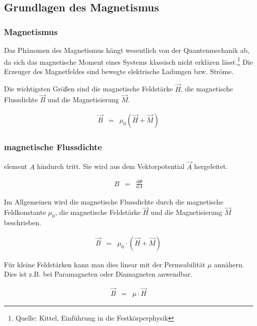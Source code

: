 \documentclass[12pt,a4paper]{scrartcl}
\numberwithin{equation}{section} %
\begin{document}
\hypertarget{grundlagen-des-magnetismus}{%
\subsection{Grundlagen des
Magnetismus}\label{grundlagen-des-magnetismus}}

\hypertarget{magnetismus}{%
\subsubsection{Magnetismus}\label{magnetismus}}

Das Phänomen des Magnetismus hängt wesentlich von der Quantenmechanik
ab, da sich das magnetische Moment eines Systems klassisch nicht
erklären lässt.\footnote{Quelle: Kittel, Einführung in die
  Festkörperphysik} Die Erzeuger des Magnetfeldes sind bewegte
elektrische Ladungen bzw. Ströme.

Die wichtigsten Größen sind die magnetische Feldstärke $\vec H$, die
magnetische Flussdichte $\vec B$ und die Magnetisierung $\vec M$.

\begin{eqnarray}
    \vec{B} &=& \mu_0
        \left(
            \vec H + \vec M
        \right)
\end{eqnarray}

\hypertarget{magnetische-flussdichte}{%
\subsubsection{magnetische Flussdichte}\label{magnetische-flussdichte}}

element $A$ hindurch tritt. Sie wird aus dem Vektorpotential
$\vec A$ hergeleitet.

\begin{eqnarray}
    B &=& \frac{\mathrm d\Phi}{\mathrm dA}
\end{eqnarray}

Im Allgemeinen wird die magnetische Flussdichte durch die magnetische
Feldkonstante $\mu_0$, die magnetische Feldstärke $\vec H$ und die
Magnetisierung $\vec M$ beschrieben.

\begin{eqnarray}
    \vec B &=& \mu_0 \cdot \left(\vec H + \vec M\right)
\end{eqnarray}

Für kleine Feldstärken kann man dies linear mit der Permeabilität
$\mu$ annähern. Dies ist z.B. bei Paramagneten oder Diamagneten
anwendbar.

\begin{eqnarray}
    \vec B &=& \mu \cdot \vec H
\end{eqnarray}
\end{document}
